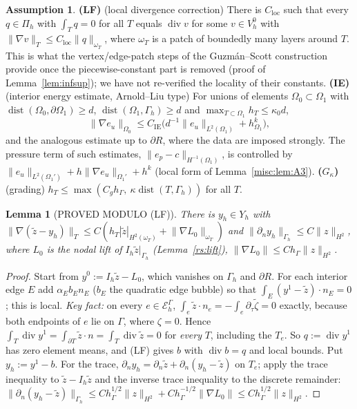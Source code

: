 \documentclass[11pt,reqno]{amsart}
\theoremstyle{plain}
\newtheorem{lemma}[theorem]{Lemma}
\theoremstyle{definition}
\newtheorem{assumption}[theorem]{Assumption}
\newcommand{\hG}{h_\Gamma}
\newcommand{\Gh}{\Gamma_h}
\newcommand{\EG}{\mathcal E_h^\Gamma}
\newcommand{\VO}{V_h^0}
\newcommand{\Pih}{\Pi_h}
\newcommand{\dn}{\partial_n}
\newcommand{\dt}{\partial_\tau}
\newcommand{\norm}[1]{\lVert #1\rVert}
\renewcommand{\div}{\operatorname{div}}
\DeclareMathOperator{\dist}{dist}
\begin{document}
\begin{assumption}\label{misc:ass:G}
\textbf{(LF)} (local divergence correction) There is $C_{\mathrm{loc}}$ such that every $q\in\Pih$ with $\int_Tq=0$ for all $T$ equals $\div v$ for some $v\in\VO$ with $\norm{\nabla v}_T\le C_{\mathrm{loc}}\norm q_{\omega_T}$, where $\omega_T$ is a patch of boundedly many layers around $T$. This is what the vertex/edge-patch steps of the Guzm\'an--Scott construction provide once the piecewise-constant part is removed (proof of Lemma~\ref{lem:infsup}); we have not re-verified the locality of their constants.
\textbf{(IE)} (interior energy estimate, Arnold--Liu type) For unions of elements $\Omega_0\subset\Omega_1$ with $\dist(\Omega_0,\partial\Omega_1)\ge d$, $\dist(\Omega_1,\Gh)\ge d$ and $\max_{T\subset\Omega_1}h_T\le\kappa_0d$,
\[
\norm{\nabla e_u}_{\Omega_0}\le C_{\mathrm{IE}}\bigl(d^{-1}\norm{e_u}_{L^2(\Omega_1)}+h_{\Omega_1}^k\bigr),
\]
and the analogous estimate up to $\partial R$, where the data are imposed strongly. The pressure term of such estimates, $\norm{e_p-c}_{H^{-1}(\Omega_1)}$, is controlled by $\norm{e_u}_{L^2(\Omega_1')}+h\norm{\nabla e_u}_{\Omega_1'}+h^k$ (local form of Lemma~\ref{misc:lem:A3}).
\textbf{($G_\kappa$)} (grading) $h_T\le\max(C_g\hG,\ \kappa\dist(T,\Gh))$ for all $T$.
\end{assumption}

\begin{lemma}[PROVED MODULO (LF)]\label{misc:lem:G1}
There is $y_h\in Y_h$ with $\norm{\nabla(\tilde z-y_h)}_T\le C(h_T|\tilde z|_{H^2(\omega_T)}+\norm{\nabla L_0}_{\omega_T})$ and $\norm{\dn y_h}_{\Gh}\le C\norm z_{H^2}$, where $L_0$ is the nodal lift of $I_h\tilde z|_{\Gh}$ (Lemma~\ref{rs:lift}), $\norm{\nabla L_0}\le C\hG\norm z_{H^2}$.
\end{lemma}

\begin{proof}
Start from $y^0:=I_h\tilde z-L_0$, which vanishes on $\Gh$ and $\partial R$. For each interior edge $E$ add $\alpha_Eb_En_E$ ($b_E$ the quadratic edge bubble) so that $\int_E(y^1-\tilde z)\cdot n_E=0$; this is local. \emph{Key fact:} on every $e\in\EG$, $\int_e\tilde z\cdot n_e=-\int_e\dt\tilde\zeta=0$ exactly, because both endpoints of $e$ lie on $\Gamma$, where $\zeta=0$. Hence $\int_T\div y^1=\int_{\partial T}\tilde z\cdot n=\int_T\div\tilde z=0$ for \emph{every} $T$, including the $T_e$. So $q:=\div y^1$ has zero element means, and (LF) gives $b$ with $\div b=q$ and local bounds. Put $y_h:=y^1-b$. For the trace, $\dn y_h=\dn\tilde z+\dn(y_h-\tilde z)$ on $T_e$; apply the trace inequality to $\tilde z-I_h\tilde z$ and the inverse trace inequality to the discrete remainder: $\norm{\dn(y_h-\tilde z)}_{\Gh}\le C\hG^{1/2}\norm z_{H^2}+C\hG^{-1/2}\norm{\nabla L_0}\le C\hG^{1/2}\norm z_{H^2}$.
\end{proof}
\end{document}
